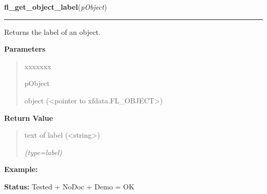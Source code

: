 \hspace{.8\funcindent}\begin{boxedminipage}{\funcwidth}

    \raggedright \textbf{fl\_get\_object\_label}(\textit{pObject})

    \vspace{-1.5ex}

    \rule{\textwidth}{0.5\fboxrule}
\setlength{\parskip}{2ex}
    Returns the label of an object.

\setlength{\parskip}{1ex}
      \textbf{Parameters}
      \vspace{-1ex}

      \begin{quote}
        \begin{Ventry}{xxxxxxx}

          \item[pObject]

          object ({\textless}pointer to xfdata.FL\_OBJECT{\textgreater})

        \end{Ventry}

      \end{quote}

      \textbf{Return Value}
    \vspace{-1ex}

      \begin{quote}
      text of label ({\textless}string{\textgreater})

      {\it (type=label)}

      \end{quote}

\textbf{Example:} 

\textbf{Status:} Tested + NoDoc + Demo = OK



    \end{boxedminipage}

    \label{xformslib:library:fl_set_object_helper}

    \vspace{0.5ex}

